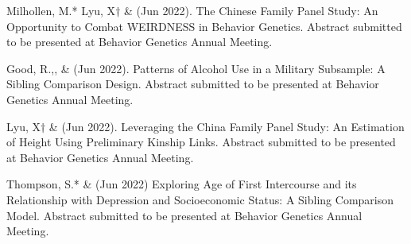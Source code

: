
\item Milhollen, M.* Lyu, X$\dagger$ \&  \meb (Jun 2022). The Chinese Family Panel Study: An Opportunity to Combat WEIRDNESS in Behavior Genetics. Abstract submitted to be presented at Behavior Genetics Annual Meeting.

\item Good, R.,\noteA \yrh, \&  \meb (Jun 2022). Patterns of Alcohol Use in a Military Subsample: A Sibling Comparison Design. Abstract submitted to be presented at Behavior Genetics Annual Meeting.

\item Lyu, X$\dagger$ \&  \meb (Jun 2022). Leveraging the China Family Panel Study: An Estimation of Height Using Preliminary Kinship Links. Abstract submitted to be presented at Behavior Genetics Annual Meeting.

%
\item Thompson, S.* \& \meb (Jun 2022) Exploring Age of First Intercourse and its Relationship with Depression and Socioeconomic Status: A Sibling Comparison Model.  Abstract submitted to be presented at Behavior Genetics Annual Meeting.
%

%

%

%

%
